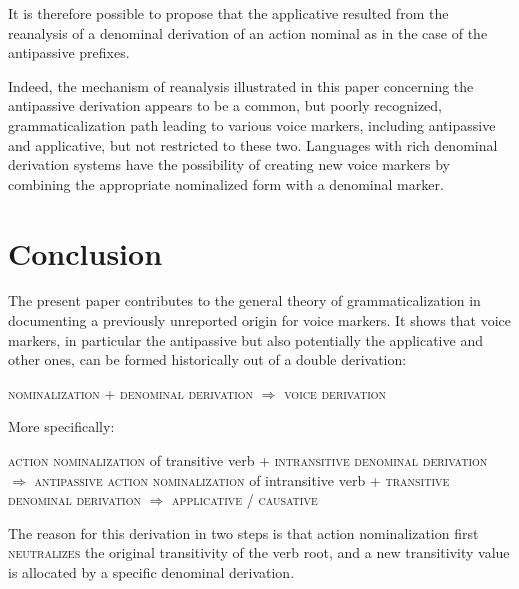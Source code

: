 \documentclass[oldfontcommands,oneside,a4paper,11pt]{article}
\begin{document}
It is therefore possible to propose that the applicative resulted from the reanalysis of a denominal derivation of an action nominal as in the case of the antipassive prefixes.

 
  
Indeed, the mechanism of reanalysis illustrated in this paper concerning the antipassive derivation appears to be a common, but poorly recognized, grammaticalization path leading to various voice markers, including antipassive and applicative, but not restricted to these two. Languages with rich denominal derivation systems have the possibility of creating new voice markers by combining the appropriate nominalized form with a denominal marker. 


\section{Conclusion}
The present paper contributes to the general theory of grammaticalization in documenting a previously unreported origin for voice markers. It shows that voice markers, in particular the antipassive but also potentially the applicative and other ones, can be formed historically out of a double derivation:

\begin{exe}
\ex
\glt \textsc{nominalization} + \textsc{denominal derivation} $\Rightarrow$ \textsc{voice derivation}
\end{exe}

More specifically:

\begin{exe}
\ex
\glt \textsc{action nominalization} of transitive verb + \textsc{intransitive denominal derivation} $\Rightarrow$ \textsc{antipassive}
\ex
\glt \textsc{action nominalization} of intransitive verb + \textsc{transitive denominal derivation} $\Rightarrow$ \textsc{applicative} / \textsc{causative}
\end{exe}

The reason for this derivation in two steps is that action nominalization first \textsc{neutralizes} the original transitivity of the verb root, and a new transitivity value is allocated by a specific denominal derivation.




\end{document}
